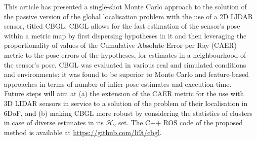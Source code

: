 This article has presented a single-shot Monte Carlo approach to the solution
of the passive version of the global localisation problem with the use of a 2D
LIDAR sensor, titled CBGL. CBGL allows for the fast estimation of the sensor's
pose within a metric map by first dispersing hypotheses in it and then
leveraging the proportionality of values of the Cumulative Absolute Error per
Ray (CAER) metric to the pose errors of the hypotheses, for estimates in a
neighbourhood of the sensor's pose. CBGL was evaluated in various real and
simulated conditions and environments; it was found to be superior to Monte
Carlo and feature-based approaches in terms of number of inlier pose estimates
and execution time. Future steps will aim at (a) the extension of the CAER
metric for the use with 3D LIDAR sensors in service to a solution of the
problem of their localisation in 6DoF, and (b) making CBGL more robust
by considering the statistics of clusters in case of diverse estimates in its
$\mathcal{H}_2$ set. The C++ ROS code of the proposed method is available at
\url{https://github.com/li9i/cbgl}.
